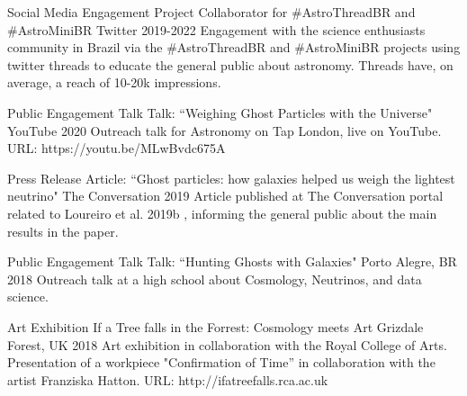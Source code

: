 

\begin{cventries}
    
  \cventry
    {Social Media Engagement} %
    {Project Collaborator for \#AstroThreadBR and \#AstroMiniBR } %
    {Twitter} %
    {2019-2022} %
    {
      {Engagement with the science enthusiasts community in Brazil via the \#AstroThreadBR and \#AstroMiniBR projects using twitter threads to educate the general public about astronomy. Threads have, on average, a reach of 10-20k impressions.}
    }

  \cventry
    {Public Engagement Talk} %
    {Talk: ``Weighing Ghost Particles with the Universe"} %
    {YouTube} %
    {2020} %
    {
      {Outreach talk for Astronomy on Tap London, live on YouTube. URL: https://youtu.be/MLwBvdc675A}
    }

  
  \cventry
    {Press Release} %
    {Article: ``Ghost particles: how galaxies helped us weigh the lightest neutrino"} %
    {The Conversation} %
    {2019} %
    {
      {Article published at The Conversation portal related to Loureiro et al. 2019b , informing the general public about the main results in the paper.}
    }


 \cventry
    {Public Engagement Talk} %
    {Talk: ``Hunting Ghosts with Galaxies"} %
    {Porto Alegre, BR} %
    {2018} %
    {
      {Outreach talk at a high school about Cosmology, Neutrinos, and data science.}
    }

  \cventry
    {Art Exhibition} %
    {If a Tree falls in the Forrest: Cosmology meets Art} %
    {Grizdale Forest, UK} %
    {2018} %
    {
      {Art exhibition in collaboration with the Royal College of Arts. Presentation of a workpiece "Confirmation of Time” in collaboration with the artist Franziska Hatton. URL: http://ifatreefalls.rca.ac.uk}
    }


\end{cventries}
